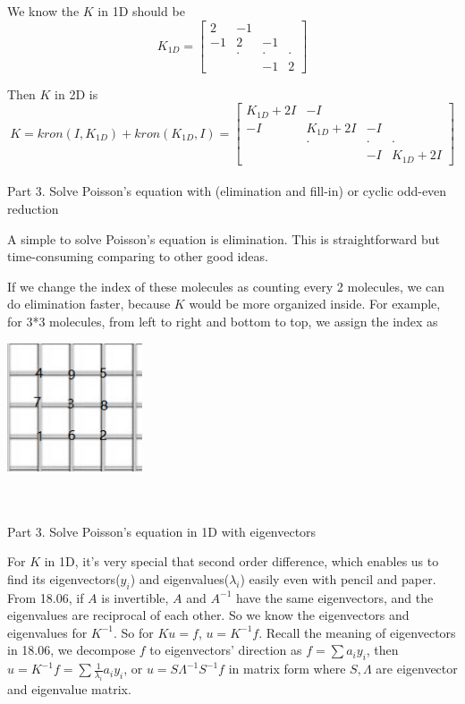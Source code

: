 \documentclass{article}
\newenvironment{nscenter}
{\parskip=0pt\par\nopagebreak\centering}
{\par\noindent\ignorespacesafterend}
\begin{document}
\begin{spacing}{1.5}
We know the $K$ in 1D should be 
$$
K_{1D}=
\begin{bmatrix}
2 & -1 &  &  \\
-1 & 2 & -1 &  \\
&  \cdot & \cdot & \cdot \\
&  & -1 & 2
\end{bmatrix}
$$

Then $K$ in 2D is 
$$
K=kron(I, K_{1D}) + kron(K_{1D},I)=
\begin{bmatrix}
K_{1D}+2I & -I &  &  \\
-I & K_{1D}+2I & -I &  \\
&  \cdot & \cdot & \cdot \\
&  & -I & K_{1D}+ 2I
\end{bmatrix}
$$
\\ Part 3. Solve Poisson's equation with (elimination and fill-in) or cyclic odd-even reduction

A simple to solve Poisson's equation is elimination. This is straightforward but time-consuming comparing to other good ideas.

If we change the index of these molecules as counting every 2 molecules, we can do elimination faster, because $K$ would be more organized inside. For example, for 3*3 molecules, from left to right and bottom to top, we assign the index as 
\\\begin{nscenter}
	\includegraphics[width=0.3\textwidth]{cyclic_odd-even_reduction.png}
\end{nscenter}
\\\\ Part 3. Solve Poisson's equation in 1D with eigenvectors

For $K$ in 1D, it's very special that second order difference, which enables us to find its eigenvectors($y_i$) and eigenvalues($\lambda_i$) easily even with pencil and paper.
From 18.06, if $A$ is invertible, $A$ and $A^{-1}$ have the same eigenvectors, and the eigenvalues are reciprocal of each other. So we know the eigenvectors and eigenvalues for $K^{-1}$. So for $Ku=f$, $u=K^{-1}f$. Recall the meaning of eigenvectors in 18.06, we decompose $f$ to eigenvectors' direction as $f=\sum a_iy_i$, then $u=K^{-1}f=\sum \frac{1}{\lambda_i}a_iy_i$, or $u=S\Lambda^{-1}S^{-1}f$ in matrix form where $S, \Lambda$ are eigenvector and eigenvalue matrix.


\end{spacing}
\end{document}
